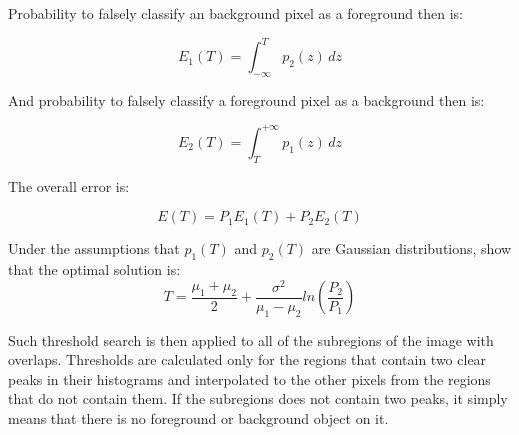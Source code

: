 Probability to falsely classify an background pixel as a foreground then is:

\begin{equation}
    E_1(T) = \int_{-\infty}^T{p_2(z) \, dz}
\end{equation}

And probability to falsely classify a foreground pixel as a background then is:

\begin{equation}
    E_2(T) = \int_T^{+\infty}{p_1(z) \, dz}
\end{equation}

The overall error is:

\begin{equation}
    E(T) = P_1E_1(T) + P_2E_2(T)
\end{equation}

Under the assumptions that $p_1(T)$ and $p_2(T)$ are Gaussian distributions, \cite{digital_image_book} show that the optimal solution is:
\begin{equation}
    T = \frac{\mu_1 + \mu_2}{2} + \frac{\sigma^2}{\mu_1 - \mu_2}ln\left(\frac{P_2}{P_1}\right)
\end{equation}

Such threshold search is then applied to all of the subregions of the image with overlaps. Thresholds are calculated only for the regions that contain two clear peaks in their histograms and interpolated to the other pixels from the regions that do not contain them. If the subregions does not contain two peaks, it simply means that there is no foreground or background object on it. 